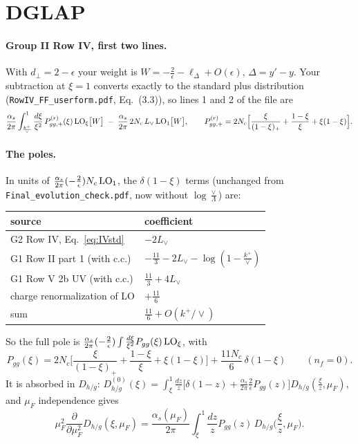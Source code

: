 \documentclass[10pt]{article}
\numberwithin{equation}{section}
\newcommand{\Lv}{L_{\vee}}
\newcommand{\LOx}[1]{{\rm LO}_\xi\big[#1\big]}
\begin{document}
\section{DGLAP}\label{sec:dglap}
\paragraph{Group II Row IV, first two lines.} With $d_\perp=2-\epsilon$ your weight is $W=-\frac{2}{\epsilon}-\ell_\Delta+O(\epsilon)$, $\Delta=y'-y$. Your subtraction at $\xi=1$ converts exactly to the standard plus distribution (\texttt{RowIV\_FF\_userform.pdf}, Eq.~(3.3)), so lines 1 and 2 of the file are
\begin{equation}
\frac{\alpha_s}{2\pi}\int_{\frac{k^+}{\vee}}^1\frac{d\xi}{\xi^2}\,P^{(r)}_{gg,+}(\xi)\,\LOx{W}\;-\;\frac{\alpha_s}{2\pi}\,2N_c\,\Lv\,{\rm LO}_1\big[W\big],\qquad P^{(r)}_{gg,+}=2N_c\Big[\frac{\xi}{(1-\xi)_+}+\frac{1-\xi}{\xi}+\xi(1-\xi)\Big].
\label{eq:IVstd}
\end{equation}
\paragraph{The poles.} In units of $\frac{\alpha_s}{2\pi}(-\frac2\epsilon)N_c\,{\rm LO}_1$, the $\delta(1-\xi)$ terms (unchanged from \texttt{Final\_evolution\_check.pdf}, now without $\log\frac{\vee}{\Lambda}$) are:
\begin{table}[H]\centering\small
\begin{tabular}{@{}ll@{}}\toprule
source & coefficient\\\midrule
G2 Row IV, Eq.~\eqref{eq:IVstd} & $-2\Lv$\\
G1 Row II part 1 (with c.c.) & $-\frac{11}{3}-2\Lv-\log(1-\frac{k^+}{\vee})$\\
G1 Row V 2b UV (with c.c.) & $\frac{11}{3}+4\Lv$\\
charge renormalization of LO & $+\frac{11}{6}$\\\midrule
sum & $\frac{11}{6}+O(k^+/\vee)$\\\bottomrule
\end{tabular}
\end{table}
\noindent So the full pole is $\frac{\alpha_s}{2\pi}(-\frac2\epsilon)\int\frac{d\xi}{\xi^2}P_{gg}(\xi)\,{\rm LO}_\xi$, with
\begin{equation*}
P_{gg}(\xi)=2N_c\Big[\frac{\xi}{(1-\xi)_+}+\frac{1-\xi}{\xi}+\xi(1-\xi)\Big]+\frac{11N_c}{6}\,\delta(1-\xi)\qquad(n_f=0).
\end{equation*}
It is absorbed in $D_{h/g}$: $D^{(0)}_{h/g}(\xi)=\int_\xi^1\frac{dz}{z}\big[\delta(1-z)+\frac{\alpha_s}{2\pi}\frac{2}{\epsilon}P_{gg}(z)\big]D_{h/g}(\frac\xi z,\mu_F)$, and $\mu_F$ independence gives
\begin{equation}
\mu_F^2\frac{\partial}{\partial\mu_F^2}D_{h/g}(\xi,\mu_F)=\frac{\alpha_s(\mu_F)}{2\pi}\int_\xi^1\frac{dz}{z}P_{gg}(z)\,D_{h/g}\Big(\frac{\xi}{z},\mu_F\Big).
\end{equation}
\end{document}
